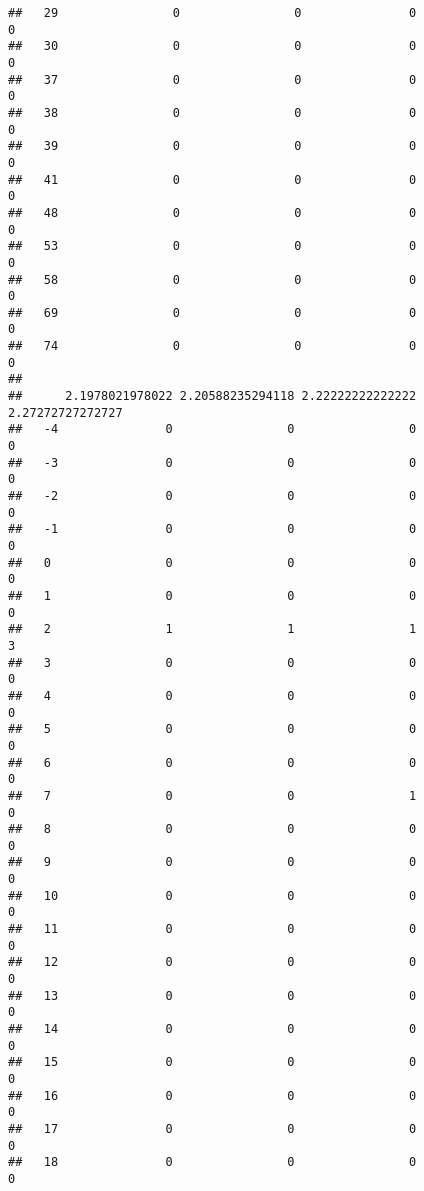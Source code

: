 \documentclass[]{article}
\begin{document}
\begin{verbatim}
##   29                0                0               0                0
##   30                0                0               0                0
##   37                0                0               0                0
##   38                0                0               0                0
##   39                0                0               0                0
##   41                0                0               0                0
##   48                0                0               0                0
##   53                0                0               0                0
##   58                0                0               0                0
##   69                0                0               0                0
##   74                0                0               0                0
##     
##      2.1978021978022 2.20588235294118 2.22222222222222 2.27272727272727
##   -4               0                0                0                0
##   -3               0                0                0                0
##   -2               0                0                0                0
##   -1               0                0                0                0
##   0                0                0                0                0
##   1                0                0                0                0
##   2                1                1                1                3
##   3                0                0                0                0
##   4                0                0                0                0
##   5                0                0                0                0
##   6                0                0                0                0
##   7                0                0                1                0
##   8                0                0                0                0
##   9                0                0                0                0
##   10               0                0                0                0
##   11               0                0                0                0
##   12               0                0                0                0
##   13               0                0                0                0
##   14               0                0                0                0
##   15               0                0                0                0
##   16               0                0                0                0
##   17               0                0                0                0
##   18               0                0                0                0

\end{verbatim}
\end{document}
